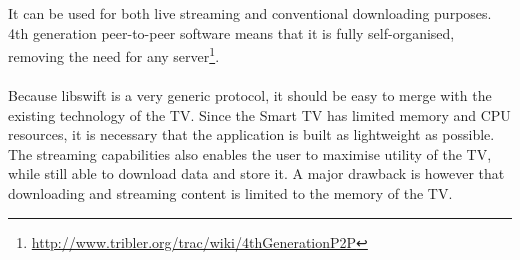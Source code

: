 It can be used for both live streaming and conventional downloading purposes.
4th generation peer-to-peer software means that it is fully self-organised, removing the need for any server\footnote{\url{http://www.tribler.org/trac/wiki/4thGenerationP2P}}.
\\\\
Because libswift is a very generic protocol, it should be easy to merge with the existing technology of the TV.
Since the Smart TV has limited memory and CPU resources, 
it is necessary that the application is built as lightweight as possible.
The streaming capabilities also enables the user to maximise utility of the TV,
while still able to download data and store it.
A major drawback is however that downloading and streaming content is limited to the memory of the TV.
